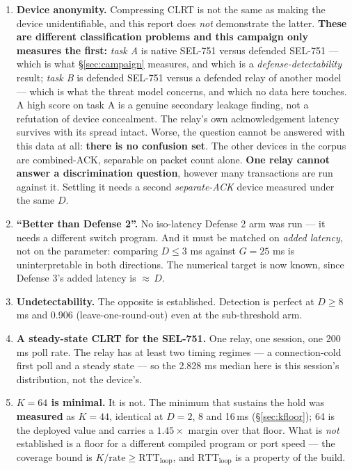 \documentclass[10pt,a4paper,oneside]{article}
\newcommand{\num}[1]{\mbox{#1}}
\begin{document}
\begin{enumerate}[leftmargin=1.5em,itemsep=0.25em]
\item \textbf{Device anonymity.} Compressing CLRT is not the same as making the device
  unidentifiable, and this report does \emph{not} demonstrate the latter. \textbf{
  These are different classification problems and this campaign only measures the first:}
  \emph{task A} is native SEL-751 versus defended SEL-751 --- which is what
  \S\ref{sec:campaign} measures, and which is a \emph{defense-detectability} result;
  \emph{task B} is defended SEL-751 versus a defended relay of another model --- which is
  what the threat model concerns, and which no data here touches. A high score on task A is
  a genuine secondary leakage finding, not a refutation of device concealment. The relay's own
  acknowledgement latency survives with its spread intact. Worse, the question cannot be
  answered with this data at all: \textbf{there is no confusion set}. The other devices in
  the corpus are combined-ACK, separable on packet count alone. \textbf{One relay cannot
  answer a discrimination question}, however many transactions are run against it. Settling
  it needs a second \emph{separate-ACK} device measured under the same $D$.
\item \textbf{``Better than Defense 2''.} No iso-latency Defense 2 arm was run --- it needs a
  different switch program. And it must be matched on \emph{added latency}, not on the
  parameter: comparing $D\le3$ ms against $G=25$ ms is uninterpretable in both directions.
  The numerical target is now known, since Defense 3's added latency is ${\approx}\,D$.
\item \textbf{Undetectability.} The opposite is established. Detection is perfect at
  $D\ge8$\,ms and \num{0.906} (leave-one-round-out) even at the sub-threshold arm.
\item \textbf{A steady-state CLRT for the SEL-751.} One relay, one session, one 200 ms poll
  rate. The relay has at least two timing regimes --- a connection-cold first poll and a
  steady state --- so the \num{2.828} ms median here is this session's distribution, not the
  device's.
\item \textbf{$K=64$ is minimal.} It is not. The minimum that sustains the hold was
  \textbf{measured} as $K=44$, identical at $D=2$, 8 and 16\,ms (\S\ref{sec:kfloor}); 64 is
  the deployed value and carries a $1.45\times$ margin over that floor. What is \emph{not}
  established is a floor for a different compiled program or port speed --- the coverage
  bound is $K/\text{rate}\ge \mathrm{RTT}_{\text{loop}}$, and $\mathrm{RTT}_{\text{loop}}$
  is a property of the build.

\end{enumerate}
\end{document}
